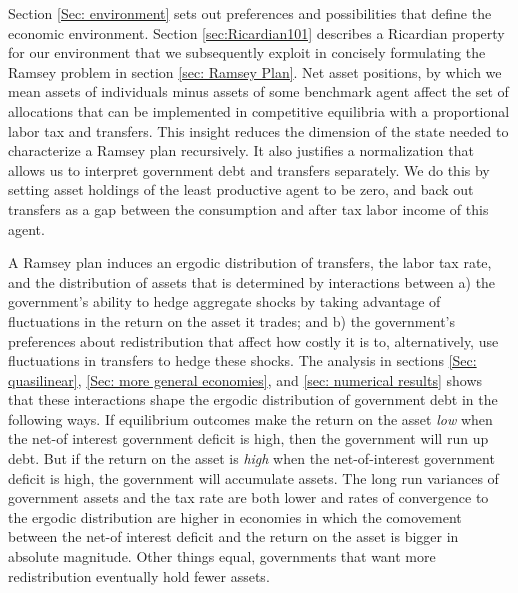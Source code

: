 \documentclass[thmsb,11pt]{article}
\begin{document}
%
%

Section \ref{Sec: environment} sets out  preferences and possibilities that define the economic environment.
Section \ref{sec:Ricardian101}
describes a  Ricardian property for our environment that we subsequently exploit in concisely formulating the Ramsey problem
in section \ref{sec: Ramsey Plan}.
Net asset positions, by which we mean assets of individuals minus assets of some benchmark agent affect the set of allocations that can be implemented
in competitive equilibria with a proportional labor tax and transfers.
This insight reduces the dimension of the state needed to characterize a Ramsey plan recursively. It also justifies a normalization that allows us to interpret government debt and transfers separately. We do this by setting asset holdings of the least productive agent to be zero, and back out transfers as a gap between the consumption and after tax labor income of this agent. 



A Ramsey plan induces an ergodic distribution of transfers,   the labor tax rate, and the distribution of assets that is
  determined by interactions between
a) the government's  ability to hedge aggregate shocks by taking advantage of fluctuations in  the return on the asset it trades;
and b) the government's preferences about  redistribution that affect how costly it is to, alternatively, use fluctuations in transfers to hedge these shocks.
The analysis in sections \ref{Sec: quasilinear}, \ref{Sec: more general economies}, and \ref{sec: numerical results}
shows that these interactions  shape  the ergodic distribution of government debt in the following ways.
If equilibrium outcomes make the  return on the asset {\em low} when the net-of interest government deficit is high,
then the government will  run up  debt.  %
But if the return on the asset is {\em high} when the net-of-interest government deficit is high, the
 government will accumulate assets.
  The long run variances of government assets and the tax rate are both lower and  rates of convergence to the ergodic distribution are
higher in economies in which the comovement between the net-of interest deficit and  the return on  the asset is bigger in absolute magnitude.
 Other things equal, governments that want more redistribution eventually hold fewer assets.
\end{document}
